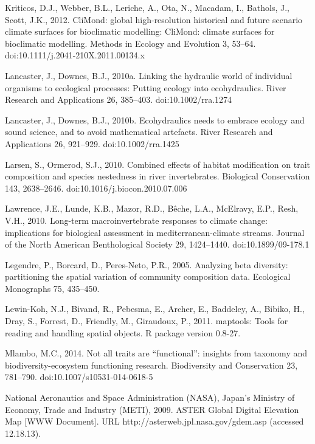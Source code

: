 \begin{thebibliography}
\bibitem{} \hangindent=1cm Kriticos, D.J., Webber, B.L., Leriche, A., Ota, N., Macadam, I., Bathols, J., Scott, J.K., 2012. CliMond: global high-resolution historical and future scenario climate surfaces for bioclimatic modelling: CliMond: climate surfaces for bioclimatic modelling. Methods in Ecology and Evolution 3, 53–64. doi:10.1111/j.2041-210X.2011.00134.x

\bibitem{} \hangindent=1cm Lancaster, J., Downes, B.J., 2010a. Linking the hydraulic world of individual organisms to ecological processes: Putting ecology into ecohydraulics. River Research and Applications 26, 385–403. doi:10.1002/rra.1274

\bibitem{} \hangindent=1cm Lancaster, J., Downes, B.J., 2010b. Ecohydraulics needs to embrace ecology and sound science, and to avoid mathematical artefacts. River Research and Applications 26, 921–929. doi:10.1002/rra.1425

\bibitem{} \hangindent=1cm Larsen, S., Ormerod, S.J., 2010. Combined effects of habitat modification on trait composition and species nestedness in river invertebrates. Biological Conservation 143, 2638–2646. doi:10.1016/j.biocon.2010.07.006

\bibitem{} \hangindent=1cm Lawrence, J.E., Lunde, K.B., Mazor, R.D., Bêche, L.A., McElravy, E.P., Resh, V.H., 2010. Long-term macroinvertebrate responses to climate change: implications for biological assessment in mediterranean-climate streams. Journal of the North American Benthological Society 29, 1424–1440. doi:10.1899/09-178.1

\bibitem{} \hangindent=1cm Legendre, P., Borcard, D., Peres-Neto, P.R., 2005. Analyzing beta diversity: partitioning the spatial variation of community composition data. Ecological Monographs 75, 435–450.

\bibitem{} \hangindent=1cm Lewin-Koh, N.J., Bivand, R., Pebesma, E., Archer, E., Baddeley, A., Bibiko, H., Dray, S., Forrest, D., Friendly, M., Giraudoux, P., 2011. maptools: Tools for reading and handling spatial objects. R package version 0.8-27.

\bibitem{} \hangindent=1cm Mlambo, M.C., 2014. Not all traits are “functional”: insights from taxonomy and biodiversity-ecosystem functioning research. Biodiversity and Conservation 23, 781–790. doi:10.1007/s10531-014-0618-5

\bibitem{} \hangindent=1cm National Aeronautics and Space Administration (NASA), Japan’s Ministry of Economy, Trade and Industry (METI), 2009. ASTER Global Digital Elevation Map [WWW Document]. URL http://asterweb.jpl.nasa.gov/gdem.asp (accessed 12.18.13).


\end{thebibliography}
